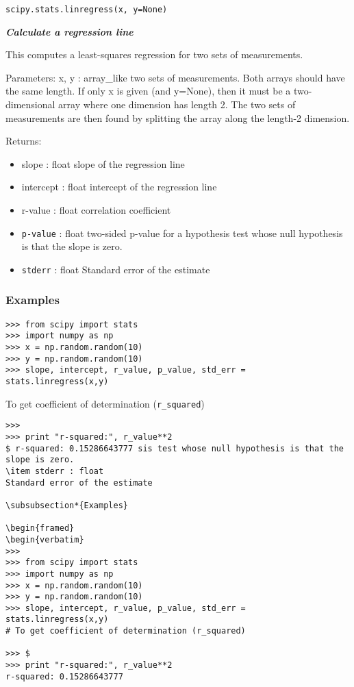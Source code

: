 \documentclass[Pydata.tex]{subfiles}
\begin{document}
 

\texttt{scipy.stats.linregress(x, y=None)}

\textbf{\textit{Calculate a regression line}}

This computes a least-squares regression for two sets of measurements.

Parameters:	
x, y : array\_like
two sets of measurements. Both arrays should have the same length. If only x is given (and y=None), then it must be a two-dimensional array where one dimension has length 2. The two sets of measurements are then found by splitting the array along the length-2 dimension.

Returns:
\begin{itemize}	
\item slope : float
slope of the regression line
\item intercept : float
intercept of the regression line
\item r-value : float
correlation coefficient
\item \texttt{p-value} : float
two-sided p-value for a hypothesis test whose null hypothesis is that the slope is zero.
\item \texttt{stderr} : float
Standard error of the estimate
\end{itemize}
\subsubsection*{Examples}

\begin{framed}
\begin{verbatim}
>>> from scipy import stats
>>> import numpy as np
>>> x = np.random.random(10)
>>> y = np.random.random(10)
>>> slope, intercept, r_value, p_value, std_err = stats.linregress(x,y)
\end{verbatim}
\end{framed}
To get coefficient of determination (\texttt{r\_squared})

\begin{framed}
\begin{verbatim}
>>>
>>> print "r-squared:", r_value**2
$ r-squared: 0.15286643777 sis test whose null hypothesis is that the slope is zero.
\item stderr : float
Standard error of the estimate

\subsubsection*{Examples}

\begin{framed}
\begin{verbatim}
>>>
>>> from scipy import stats
>>> import numpy as np
>>> x = np.random.random(10)
>>> y = np.random.random(10)
>>> slope, intercept, r_value, p_value, std_err = stats.linregress(x,y)
# To get coefficient of determination (r_squared)

>>> $
>>> print "r-squared:", r_value**2
r-squared: 0.15286643777

\end{verbatim}
\end{framed}
\end{document}
